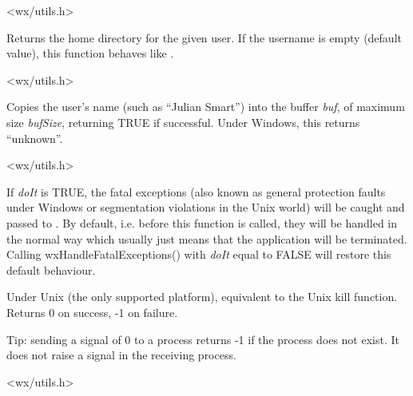
<wx/utils.h>

\label{wxgetuserhome}


Returns the home directory for the given user. If the username is empty
(default value), this function behaves like 
.


<wx/utils.h>



Copies the user's name (such as ``Julian Smart'') into the buffer {\it
buf}, of maximum size {\it bufSize}, returning TRUE if successful.
Under Windows, this returns ``unknown''.


<wx/utils.h>

\label{wxhandlefatalexceptions}


If {\it doIt} is TRUE, the fatal exceptions (also known as general protection
faults under Windows or segmentation violations in the Unix world) will be
caught and passed to .
By default, i.e. before this function is called, they will be handled in the
normal way which usually just means that the application will be terminated.
Calling wxHandleFatalExceptions() with {\it doIt} equal to FALSE will restore
this default behaviour.

\label{wxkill}


Under Unix (the only supported platform), equivalent to the Unix kill function.
Returns 0 on success, -1 on failure.

Tip: sending a signal of 0 to a process returns -1 if the process does not exist.
It does not raise a signal in the receiving process.


<wx/utils.h>

\label{wxinitallimagehandlers}

